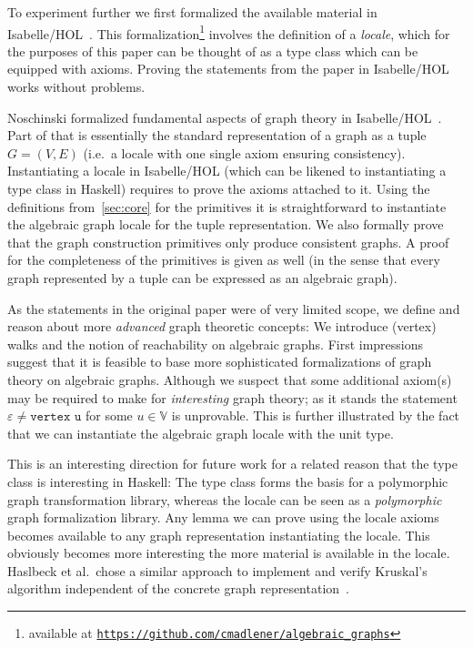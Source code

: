 \documentclass{article}
\newcommand{\hs}{\texttt}
\renewcommand{\epsilon}{\varepsilon}
\newcommand{\eps}{\epsilon}
\begin{document}
To experiment further we first formalized the available material in
Isabelle/HOL~\cite{isabelle}.
This formalization\footnote{available at
  \texttt{\href{https://github.com/cmadlener/algebraic_graphs}{https://github.com/cmadlener/algebraic\_graphs}}}
involves the definition of a \textit{locale}, which for the
purposes of this paper can be thought of as a type class which can be equipped
with axioms. Proving the statements from the paper in Isabelle/HOL works
without problems.

Noschinski formalized fundamental aspects of graph theory in
Isabelle/HOL~\cite{GraphTheory-AFP}. Part of that is essentially the standard
representation of a graph as a tuple $G=(V,E)$ (i.e.\ a locale with one single
axiom ensuring consistency). Instantiating a locale in Isabelle/HOL (which can be likened to
instantiating a type class in Haskell) requires to prove the axioms attached to
it. Using the definitions from~\autoref{sec:core} for the primitives it is
straightforward to instantiate the algebraic graph locale for the tuple
representation. We also formally prove that the graph construction primitives only
produce consistent graphs. A proof for the completeness of the primitives is
given as well (in the sense that every graph represented by a tuple can be
expressed as an algebraic graph).

As the statements in the original paper were of very limited scope, we 
define and reason about more \textit{advanced} graph theoretic concepts: We
introduce (vertex) walks and the notion of reachability on algebraic graphs.
First impressions suggest that it is feasible to base more sophisticated
formalizations of graph theory on algebraic graphs. Although we suspect that
some additional axiom(s) may be required to make for \textit{interesting} graph
theory; as it stands the statement $\eps \neq \hs{vertex u}$ for some $u \in
\mathbb{V}$ is unprovable. This is further illustrated by the fact that we can
instantiate the algebraic graph locale with the unit type.

This is an interesting direction for future work for a related reason that the
type class is interesting in Haskell: The type class forms the basis for 
a polymorphic graph transformation library, whereas the locale can be
seen as a \textit{polymorphic} graph formalization library. Any lemma we can prove
using the locale axioms becomes available to any graph representation
instantiating the locale. This obviously becomes more interesting the more material is
available in the locale. Haslbeck et al.\ chose a similar approach to implement
and verify Kruskal's algorithm independent of the concrete graph
representation~\cite{Kruskal-AFP}.
\end{document}
